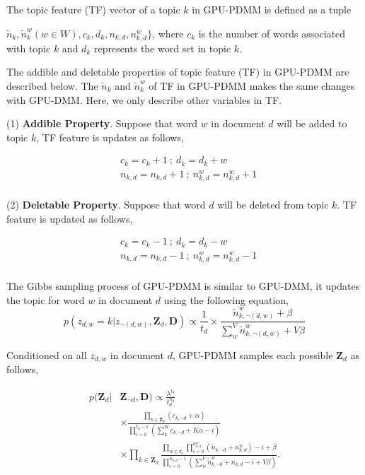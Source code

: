 \documentclass[10pt,journal,compsoc]{IEEEtran}
\begin{document}
The topic feature (TF) vector of a topic $k$ in GPU-PDMM is defined as a tuple {$\widetilde{n}_k, \widetilde{n}_k^w(w\in W), c_k, d_k, n_{k,d}, n_{k,d}^w\}$, where $c_k$ is the number of words associated with topic $k$ and $d_k$ represents the word set in topic $k$.

The addible and deletable properties of topic feature (TF) in GPU-PDMM are described below. The $\widetilde{n}_k$ and $\widetilde{n}_k^w$ of TF in GPU-PDMM makes the same changes with GPU-DMM. Here, we only describe other variables in TF.

(1) \textbf{Addible Property}. Suppose that word $w$ in document $d$ will be added to topic $k$, TF feature is updates as follows,

\[
\begin{split}
 & c_k = c_k + 1 \ ; \ d_k = d_k + {w} \\
 & n_{k,d} = n_{k,d} + 1 \ ; \ n_{k,d}^w = n_{k,d}^w + 1 \\
\end{split}
\]

(2) \textbf{Deletable Property}. Suppose that word $d$ will be deleted from topic $k$. TF feature is updated as follows,

\[
\begin{split}
 & c_k = c_k - 1 \ ; \ d_k = d_k - {w} \\
 &  n_{k,d} = n_{k,d} - 1 \ ; \ n_{k,d}^w = n_{k,d}^w - 1 \\
\end{split}
\]

The Gibbs sampling process of GPU-PDMM is similar to GPU-DMM, it updates the topic for word $w$ in document $d$ using the following equation,
\begin{equation} \label{gpupdmm_w}
p(z_{d,w}=k|z_{\neg(d,w)},\textbf{Z}_d, \bm{D})\propto\frac{1}{t_d}\times\frac{\widetilde{n}_{k,\neg(d,w)}^w+\beta}{\sum_w^V\widetilde{n}_{k,\neg(d,w)}^w+V\beta}
\end{equation}

Conditioned on all $z_{d,w}$ in document $d$, GPU-PDMM samples each possible $\textbf{Z}_d$ as follows,

\begin{equation} \label{gpupdmm_d}
\begin{split}
p(\textbf{Z}_d|& \bm{Z}_{\neg{d}}, \bm{D})\propto \frac{\lambda^{t_d}}{t_d^{n_d}}\\
&\times \frac{\prod_{k\in \textbf{Z}_d}(c_{k,\neg{d}}+\alpha)}{\prod_{i=0}^{t_d-1}(\sum_k^Kc_{k,\neg{d}}+K\alpha-i)}\\
&\times \prod_{k\in \textbf{Z}_d}
\frac{\prod_{w\in d_k} \prod_{i=0}^{n_{k,d}^w}(\widetilde{n}_{k,\neg{d}} + n_{k,d}^w)-i+\beta}
{\prod_{i=0}^{n_{k,d}-1}(\sum_w^V \widetilde{n}_{k,\neg{d}}^w+n_{k,d}-i+V\beta)}. 
\end{split}
\end{equation}

}
\end{document}
